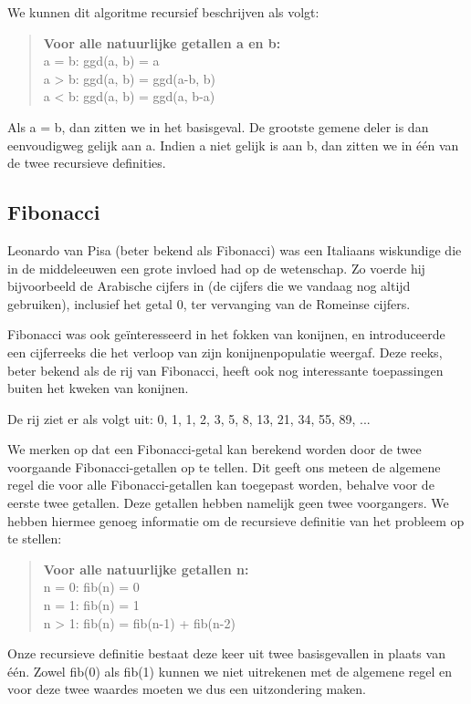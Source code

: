 We kunnen dit algoritme recursief beschrijven als volgt:

\begin{quote}
\textbf{Voor alle natuurlijke getallen a en b:} \\
a = b:  ggd(a, b) = a \\
a > b:  ggd(a, b) = ggd(a-b, b) \\
a < b:  ggd(a, b) = ggd(a, b-a)
\end{quote}

Als a = b, dan zitten we in het basisgeval. De grootste gemene deler is dan eenvoudigweg gelijk aan a. Indien a niet gelijk is aan b, dan zitten we in \'e\'en van de twee recursieve definities.

\subsection{Fibonacci}

Leonardo van Pisa (beter bekend als Fibonacci) was een Italiaans wiskundige die in de middeleeuwen een grote invloed had op de wetenschap. Zo voerde hij bijvoorbeeld de Arabische cijfers in (de cijfers die we vandaag nog altijd gebruiken), inclusief het getal 0, ter vervanging van de Romeinse cijfers.

Fibonacci was ook ge\"interesseerd in het fokken van konijnen, en introduceerde een cijferreeks die het verloop van zijn konijnenpopulatie weergaf. Deze reeks, beter bekend als de rij van Fibonacci, heeft ook nog interessante toepassingen buiten het kweken van konijnen.

De rij ziet er als volgt uit: 0, 1, 1, 2, 3, 5, 8, 13, 21, 34, 55, 89, ...

We merken op dat een Fibonacci-getal kan berekend worden door de twee voorgaande Fibonacci-getallen op te tellen. Dit geeft ons meteen de algemene regel die voor alle Fibonacci-getallen kan toegepast worden, behalve voor de eerste twee getallen. Deze getallen hebben namelijk geen twee voorgangers. We hebben hiermee genoeg informatie om de recursieve definitie van het probleem op te stellen:

\begin{quote}
\textbf{Voor alle natuurlijke getallen n:} \\
n = 0:  fib(n) = 0 \\
n = 1:  fib(n) = 1 \\
n > 1:  fib(n) = fib(n-1) + fib(n-2)
\end{quote}

Onze recursieve definitie bestaat deze keer uit twee basisgevallen in plaats van \'e\'en. Zowel fib(0) als fib(1) kunnen we niet uitrekenen met de algemene regel en voor deze twee waardes moeten we dus een uitzondering maken.

